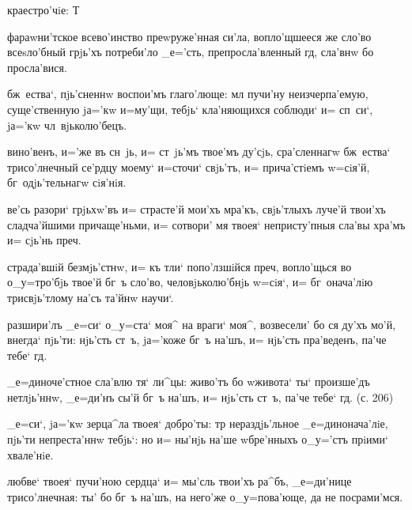 
краестро'чiе: Т%


фараwни'тское всево'инство преwруже'нная си'ла, 
вопло'щшееся же сло'во всеsло'бный грjь'хъ потреби'ло 
_е='сть, препросла'вленный гд, сла'внw бо просла'вися.

бж~ества`, пjь'сненнw воспои'мъ глаго'люще: мл 
пучи'ну неизчерпа'емую, суще'ственную jа='кw и=му'щи, 
тебjь` кла'няющихся соблюди` и= сп~си`, jа='кw 
чл~вjьколю'бецъ.

вино'венъ, и='же въ сн~jь, и= ст~jь'мъ твое'мъ ду'сjь, 
сра'сленнагw бж~ества` трисо'лнечный се'рдцу моему` 
и=сточи` свjь'тъ, и= прича'стiемъ w=сiя'й, 
бг~одjь'тельнагw сiя'нiя.

ве'сь разори` грjьхw'въ и= страсте'й мои'хъ мра'къ, 
свjь'тлыхъ луче'й твои'хъ сладча'йшими причаще'ньми, и= 
сотвори' мя твоея` непристу'пныя сла'вы хра'мъ и= сjь'нь 
преч.

страда'вшiй безмjь'стнw, и= къ тли` попо'лзшiйся 
преч, вопло'щься во о_у=тро'бjь твое'й бг~ъ сло'во, 
человjьколю'бнjь w=сiя`, и= бг~онача'лiю трисвjь'тлому 
на'съ та'йнw научи`.


разшири'лъ _е=си` о_у=ста` моя^ на враги` моя^, 
возвесели' бо ся ду'хъ мо'й, внегда` пjь'ти: нjь'сть 
ст~ъ, jа='коже бг~ъ на'шъ, и= нjь'сть пра'веденъ, па'че 
тебе` гд.

_е=диноче'стное сла'влю тя` ли^цы: живо'тъ бо w\т живота` 
ты` произше'дъ нетлjь'ннw, _е=ди'нъ сы'й бг~ъ на'шъ, и= 
нjь'сть ст~ъ, па'че тебе` гд. (с. 206)

_е=си`, jа='кw зерца^ла твоея` добро'ты: тр 
нераздjь'льное _е=динонача'лiе, пjь'ти непреста'ннw 
тебjь`: но и= ны'нjь на'ше w\т бре'нныхъ о_у='стъ прiими` 
хвале'нiе.

любве` твоея` пучи'ною сердца` и= мы'сль твои'хъ ра^бъ, 
_е=ди'нице трисо'лнечная: ты' бо бг~ъ на'шъ, на него'же 
о_у=пова'юще, да не посрами'мся.

